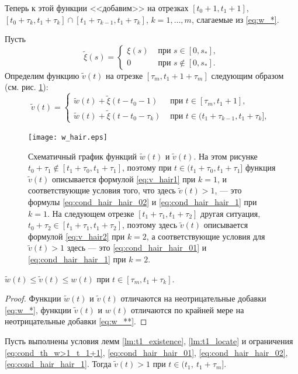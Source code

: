 Теперь к этой функции <<добавим>> на отрезках $[t_0+1,t_1+1]$, $[t_0+\tau_k, t_1+\tau_k]\cap[t_1+\tau_{k-1},t_1+\tau_k]$, $k=1,\ldots,m$, слагаемые из \eqref{eq:w_*}.

Пусть
%
\[
\tilde{\xi}(s) = 
\begin{cases}
	\xi(s) & \text{ при } s\in[0,s_*],\\
	0 & \text{ при } s\notin[0,s_*].
\end{cases}
\]
%
Определим функцию $\tilde{v}(t)$ на отрезке $[\tau_m,t_1+1+\tau_m]$ следующим образом (см. рис. \ref{fig:w_hair}):
%
\[
\tilde{v}(t) =
\begin{cases}
	\tilde{w}(t)+\tilde{\xi}(t-t_0-1)& \text{ при } t\in[\tau_{m}, t_1 + 1],\\
	\tilde{w}(t)+\tilde{\xi}(t-t_0-\tau_k)& \text{ при } t\in(t_1 + \tau_{k-1}, t_1 + \tau_k],\
\end{cases}
\]
%
%
\begin{figure}
	\centering
	\texttt{[image: w\_hair.eps]}
	\caption{Схематичный график функций $\tilde{w}(t)$ и $\tilde{v}(t)$. На этом рисунке $t_0+\tau_1 \notin[t_1+\tau_0,t_1+\tau_1]$, поэтому при $t\in(t_1+\tau_0,t_1+\tau_1]$ функция  $\tilde{v}(t)$ описывается формулой \eqref{eq:v_hair1} при $k=1$, и соответствующие условия того, что здесь $\tilde{v}(t)>1$, --- это формулы \eqref{eq:cond_hair_hair_02} и \eqref{eq:cond_hair_hair_1} при $k=1$. На следующем отрезке $[t_1+\tau_1,t_1+\tau_2]$ другая ситуация,  $t_0+\tau_2\in[t_1+\tau_1,t_1+\tau_2]$, поэтому здесь $\tilde{v}(t)$ описывается формулой \eqref{eq:v_hair2} при $k=2$, а соответствующие условия для $\tilde{v}(t)>1$ здесь --- это \eqref{eq:cond_hair_hair_01} и \eqref{eq:cond_hair_hair_1} при $k=2$. }
	\label{fig:w_hair}
\end{figure}
%

%
\begin{proposition}
	\label{prop:w_w_hair}
	$\tilde{w}(t)\leqslant\tilde{v}(t)\leqslant w(t)$ при $t\in[\tau_m,t_1+\tau_k]$.
\end{proposition}
\begin{proof}
	Функции $\tilde{w}(t)$ и $\tilde{v}(t)$ отличаются на неотрицательные добавки \eqref{eq:w_*}, функции $\tilde{v}(t)$ и $w(t)$ отличаются по крайней мере на неотрицательные добавки \eqref{eq:w_**}.
\end{proof}

\begin{proposition}
	\label{prop:v_hair>1}
	Пусть выполнены условия лемм \ref{lm:t1_existence}, \ref{lm:t1_locate} и ограничения \eqref{eq:cond_th_w>1_t_1+1}, \eqref{eq:cond_hair_hair_01}, \eqref{eq:cond_hair_hair_02}, \eqref{eq:cond_hair_hair_1}. Тогда 
	$\tilde{v}(t)>1$ при $t\in(t_1,\ t_1+\tau_m]$.
\end{proposition}


